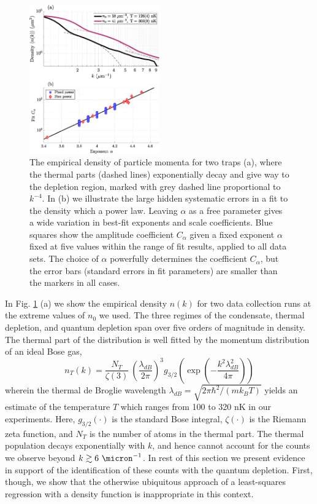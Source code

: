 	\begin{figure}[t]
	        \includegraphics[width=0.5\textwidth]{fig/depletion/exp_density}
	        \caption{The empirical density of particle momenta for two traps (a), where the thermal parts (dashed lines) exponentially decay and give way to the depletion region, marked with grey dashed line proportional to $k^{-4}$.
	        In (b) we illustrate the large hidden systematic errors in a fit to the density which a power law. Leaving $\alpha$ as a free parameter gives a wide variation in best-fit exponents and scale coefficients. Blue squares show the amplitude coefficient $C_\alpha$ given a fixed exponent $\alpha$ fixed at five values within the range of fit results, applied to all data sets. The choice of $\alpha$ powerfully determines the coefficient $C_\alpha$, but the error bars (standard errors in fit parameters) are smaller than the markers in all cases.}
	        \label{fig:contact_determination_issues}
	\end{figure}


	In Fig. \ref{fig:contact_determination_issues} (a) we show the empirical density $n(k)$ for two data collection runs at the extreme values of $n_0$ we used. The three regimes of the condensate, thermal depletion, and quantum depletion span over five orders of magnitude in density. The thermal part of the distribution is well fitted by the momentum distribution of an ideal Bose gas,
	\begin{equation}
		n_T(k) =\frac{N_T}{\zeta(3)} ~\left(\frac{\lambda_{dB}}{2\pi}\right)^3 g_{3/2}\left(\exp\left(-\frac{k^2 \lambda_{dB}^2}{4\pi}\right)\right)
		\label{eqn:th_fun}
	\end{equation}
	wherein the thermal de Broglie wavelength $\lambda_{dB} = \sqrt{2\pi\hbar^2/(m k_B T)}$  yields an estimate of the temperature $T$ which ranges from 100 to 320 nK in our experiments. Here, $g_{3/2}(\cdot)$ is the standard Bose integral, $\zeta(\cdot)$ is the Riemann zeta function, and $N_T$ is the number of atoms in the thermal part.
	The thermal population decays exponentially with $k$, and hence cannot account for the counts we observe beyond $k\gtrsim 6~\micron^{-1}$. 
	In rest of this section we present evidence in support of the identification of these counts with the quantum depletion. 
	First, though, we show that the otherwise ubiquitous approach of a least-squares regression with a density function is inappropriate in this context.

